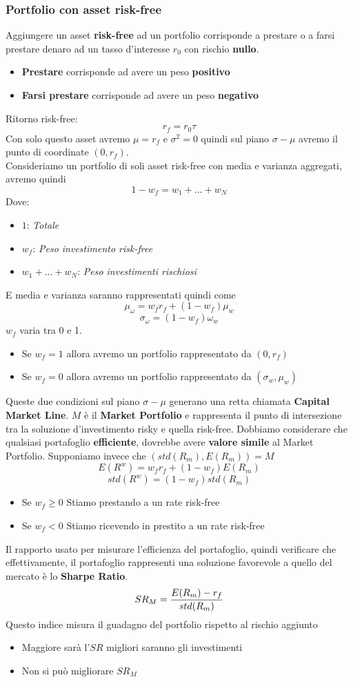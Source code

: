 \documentclass[12pt]{article}
\begin{document}
\subsubsection{Portfolio con asset risk-free}
Aggiungere un asset \textbf{risk-free} ad un portfolio corrisponde a prestare o a farsi prestare denaro ad un tasso d'interesse $r_0$ con rischio \textbf{nullo}.
\begin{itemize}
    \item \textbf{Prestare} corrisponde ad avere un peso \textbf{positivo}
    \item \textbf{Farsi prestare} corrisponde ad avere un peso \textbf{negativo}
\end{itemize}
Ritorno risk-free:
$$r_f=r_0\tau$$
Con solo questo asset avremo $\mu=r_f$ e $\sigma^2=0$ quindi sul piano $\sigma-\mu$ avremo il punto di coordinate $(0, r_f)$.\\
Consideriamo un portfolio di soli asset risk-free con media e varianza aggregati, avremo quindi
$$1-w_f=w_1+\dots+w_N$$
Dove:
\begin{itemize}[label=]
    \item $1$: \textit{Totale}
    \item $w_f$: \textit{Peso investimento risk-free}
    \item $w_1+\dots+w_N$: \textit{Peso investimenti rischiosi}
\end{itemize}
E media e varianza saranno rappresentati quindi come
$$\mu_\omega=w_fr_f+(1-w_f)\mu_w$$
$$\sigma_\omega=(1-w_f)\omega_w$$
$w_f$ varia tra 0 e 1.
\begin{itemize}
    \item Se $w_f=1$ allora avremo un portfolio rappresentato da $(0,r_f)$
    \item Se $w_f=0$ allora avremo un portfolio rappresentato da $(\sigma_w,\mu_w)$
\end{itemize}
Queste due condizioni sul piano $\sigma-\mu$ generano una retta chiamata \textbf{Capital Market Line}. $M$ è il \textbf{Market Portfolio} e rappresenta il punto di intersezione tra la soluzione d'investimento risky e quella risk-free. Dobbiamo considerare che qualsiasi portafoglio \textbf{efficiente}, dovrebbe avere \textbf{valore simile} al Market Portfolio.
Supponiamo invece che $(std(R_m),E(R_m))=M$
$$E(R^w)=w_fr_f+(1-w_f)E(R_m)$$
$$std(R^w)=(1-w_f)std(R_m)$$
\begin{itemize}
    \item Se $w_f\geq0$ Stiamo prestando a un rate risk-free
    \item Se $w_f<0$ Stiamo ricevendo in prestito a un rate risk-free
\end{itemize}
Il rapporto usato per misurare l’efficienza del portafoglio, quindi verificare che effettivamente, il portafoglio rappresenti una soluzione favorevole a quello del mercato è lo \textbf{Sharpe Ratio}.
$$SR_M={{E(R_m)-r_f}\over{std(R_m)}}$$
Questo indice misura il guadagno del portfolio rispetto al rischio aggiunto
\begin{itemize}
    \item Maggiore sarà l'$SR$ migliori saranno gli investimenti
    \item Non si può migliorare $SR_M$
\end{itemize}
\end{document}
